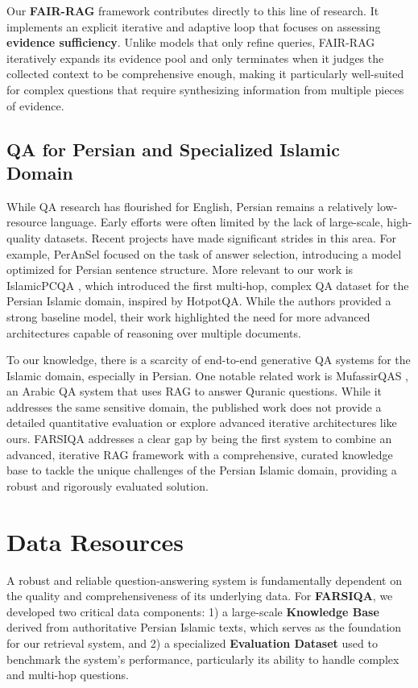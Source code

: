 \documentclass[11pt]{article}
\begin{document}
Our \textbf{FAIR-RAG} framework contributes directly to this line of research. It implements an explicit iterative and adaptive loop that focuses on assessing \textbf{evidence sufficiency}. Unlike models that only refine queries, FAIR-RAG iteratively expands its evidence pool and only terminates when it judges the collected context to be comprehensive enough, making it particularly well-suited for complex questions that require synthesizing information from multiple pieces of evidence.\cite{fairrag}

\subsection{QA for Persian and Specialized Islamic Domain}

While QA research has flourished for English, Persian remains a relatively low-resource language. \cite{fani2021survey} Early efforts were often limited by the lack of large-scale, high-quality datasets. Recent projects have made significant strides in this area. For example, PerAnSel \cite{peransel2022} focused on the task of answer selection, introducing a model optimized for Persian sentence structure. More relevant to our work is IslamicPCQA \cite{11075543}, which introduced the first multi-hop, complex QA dataset for the Persian Islamic domain, inspired by HotpotQA. \cite{yang2018hotpotqa} While the authors provided a strong baseline model, their work highlighted the need for more advanced architectures capable of reasoning over multiple documents.

To our knowledge, there is a scarcity of end-to-end generative QA systems for the Islamic domain, especially in Persian. One notable related work is MufassirQAS \cite{alan2025ragbasedquestionansweringproposal}, an Arabic QA system that uses RAG to answer Quranic questions. While it addresses the same sensitive domain, the published work does not provide a detailed quantitative evaluation or explore advanced iterative architectures like ours. FARSIQA addresses a clear gap by being the first system to combine an advanced, iterative RAG framework with a comprehensive, curated knowledge base to tackle the unique challenges of the Persian Islamic domain, providing a robust and rigorously evaluated solution.

\section{Data Resources}

A robust and reliable question-answering system is fundamentally dependent on the quality and comprehensiveness of its underlying data. For \textbf{FARSIQA}, we developed two critical data components: 1) a large-scale \textbf{Knowledge Base} derived from authoritative Persian Islamic texts, which serves as the foundation for our retrieval system, and 2) a specialized \textbf{Evaluation Dataset} used to benchmark the system's performance, particularly its ability to handle complex and multi-hop questions.
\end{document}
